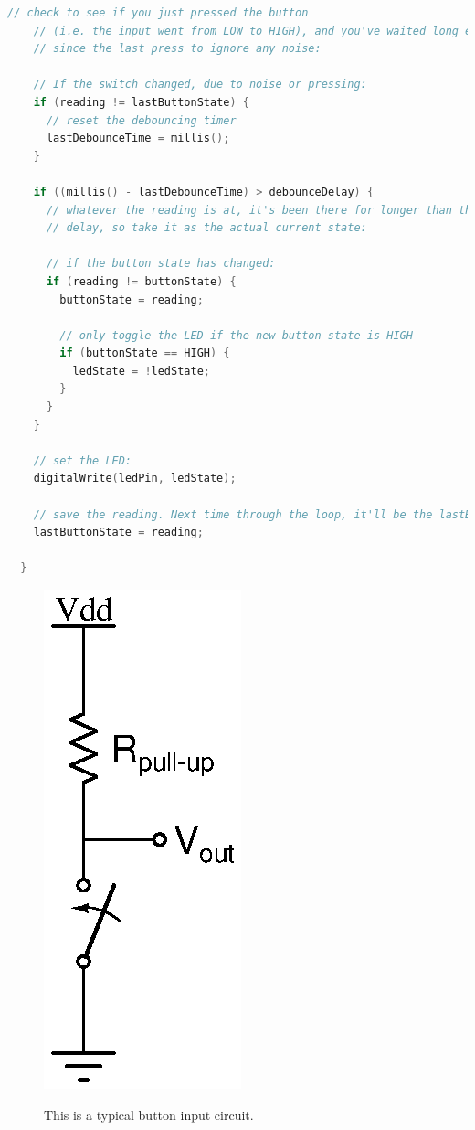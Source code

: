 \begin{lstlisting}[language=C++, caption={This is the Arduino example of software debouncing.},label={lst:debounce}]
	// check to see if you just pressed the button
	// (i.e. the input went from LOW to HIGH), and you've waited long enough
	// since the last press to ignore any noise:
  
	// If the switch changed, due to noise or pressing:
	if (reading != lastButtonState) {
	  // reset the debouncing timer
	  lastDebounceTime = millis();
	}
  
	if ((millis() - lastDebounceTime) > debounceDelay) {
	  // whatever the reading is at, it's been there for longer than the debounce
	  // delay, so take it as the actual current state:
  
	  // if the button state has changed:
	  if (reading != buttonState) {
		buttonState = reading;
  
		// only toggle the LED if the new button state is HIGH
		if (buttonState == HIGH) {
		  ledState = !ledState;
		}
	  }
	}
  
	// set the LED:
	digitalWrite(ledPin, ledState);
  
	// save the reading. Next time through the loop, it'll be the lastButtonState:
	lastButtonState = reading;
  
  }
\end{lstlisting}

\begin{figure}[!htb]
	\centering
	\includegraphics{buttonSerial/button1.eps}
	\label{fig:buttonPullup}
	\caption{This is a typical button input circuit.}
\end{figure}

